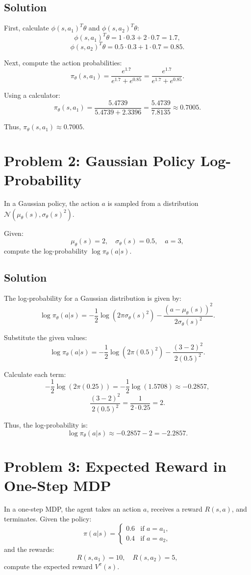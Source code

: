 \documentclass{article}
\begin{document}
\subsection*{Solution}
First, calculate \( \phi(s, a_1)^T \theta \) and \( \phi(s, a_2)^T \theta \):
\[
\phi(s, a_1)^T \theta = 1 \cdot 0.3 + 2 \cdot 0.7 = 1.7,
\]
\[
\phi(s, a_2)^T \theta = 0.5 \cdot 0.3 + 1 \cdot 0.7 = 0.85.
\]

Next, compute the action probabilities:
\[
\pi_{\theta}(s, a_1) = \frac{e^{1.7}}{e^{1.7} + e^{0.85}} = \frac{e^{1.7}}{e^{1.7} + e^{0.85}}.
\]

Using a calculator:
\[
\pi_{\theta}(s, a_1) = \frac{5.4739}{5.4739 + 2.3396} = \frac{5.4739}{7.8135} \approx 0.7005.
\]

Thus, \( \pi_{\theta}(s, a_1) \approx 0.7005 \).

\section*{Problem 2: Gaussian Policy Log-Probability}
In a Gaussian policy, the action \( a \) is sampled from a distribution \( \mathcal{N}(\mu_{\theta}(s), \sigma_{\theta}(s)^2) \).

Given:
\[
\mu_{\theta}(s) = 2, \quad \sigma_{\theta}(s) = 0.5, \quad a = 3,
\]
compute the log-probability \( \log \pi_{\theta}(a | s) \).

\subsection*{Solution}
The log-probability for a Gaussian distribution is given by:
\[
\log \pi_{\theta}(a | s) = -\frac{1}{2} \log(2 \pi \sigma_{\theta}(s)^2) - \frac{(a - \mu_{\theta}(s))^2}{2 \sigma_{\theta}(s)^2}.
\]

Substitute the given values:
\[
\log \pi_{\theta}(a | s) = -\frac{1}{2} \log(2 \pi (0.5)^2) - \frac{(3 - 2)^2}{2 (0.5)^2}.
\]

Calculate each term:
\[
-\frac{1}{2} \log(2 \pi (0.25)) = -\frac{1}{2} \log(1.5708) \approx -0.2857,
\]
\[
\frac{(3 - 2)^2}{2 (0.5)^2} = \frac{1}{2 \cdot 0.25} = 2.
\]

Thus, the log-probability is:
\[
\log \pi_{\theta}(a | s) \approx -0.2857 - 2 = -2.2857.
\]

\section*{Problem 3: Expected Reward in One-Step MDP}
In a one-step MDP, the agent takes an action \( a \), receives a reward \( R(s, a) \), and terminates. Given the policy:
\[
\pi(a | s) = \begin{cases} 0.6 & \text{if } a = a_1, \\ 0.4 & \text{if } a = a_2, \end{cases}
\]
and the rewards:
\[
R(s, a_1) = 10, \quad R(s, a_2) = 5,
\]
compute the expected reward \( V^{\pi}(s) \).
\end{document}
